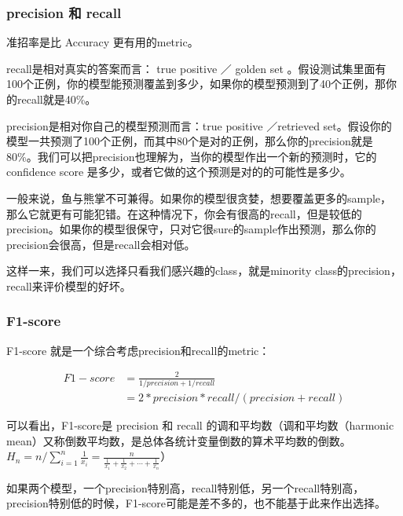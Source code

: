\documentclass[12pt]{article}
\begin{document}
\subsubsection{precision 和 recall}
准招率是比 Accuracy 更有用的metric。

recall是相对真实的答案而言： true positive ／ golden set 。假设测试集里面有100个正例，你的模型能预测覆盖到多少，如果你的模型预测到了40个正例，那你的recall就是40\%。

precision是相对你自己的模型预测而言：true positive ／retrieved set。假设你的模型一共预测了100个正例，而其中80个是对的正例，那么你的precision就是80\%。我们可以把precision也理解为，当你的模型作出一个新的预测时，它的confidence score 是多少，或者它做的这个预测是对的的可能性是多少。

一般来说，鱼与熊掌不可兼得。如果你的模型很贪婪，想要覆盖更多的sample，那么它就更有可能犯错。在这种情况下，你会有很高的recall，但是较低的precision。如果你的模型很保守，只对它很sure的sample作出预测，那么你的precision会很高，但是recall会相对低。

这样一来，我们可以选择只看我们感兴趣的class，就是minority class的precision，recall来评价模型的好坏。

\subsubsection{F1-score}
F1-score 就是一个综合考虑precision和recall的metric： 

\begin{align*}
F1-score &= \frac{2}{1/precision + 1/recall}\\
     &= 2 * precision * recall / (precision + recall) 
\end{align*}

可以看出，F1-score是 precision 和 recall 的调和平均数（调和平均数（harmonic mean）又称倒数平均数，是总体各统计变量倒数的算术平均数的倒数。$H_n = n/\sum_{i=1}^n\frac{1}{x_i} = \frac{n}{\frac{1}{x_1} + \frac{1}{x_2} + \cdots + \frac{1}{x_n}}$）

如果两个模型，一个precision特别高，recall特别低，另一个recall特别高，precision特别低的时候，F1-score可能是差不多的，也不能基于此来作出选择。



\end{document}
